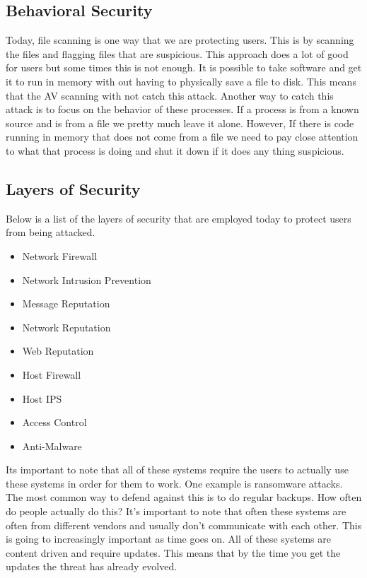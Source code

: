 \documentclass[letterpaper, onecolumn,10pt]{IEEEtran}
\begin{document}
            \subsection{Behavioral Security}
            Today, file scanning is one way that we are protecting users. This is by scanning the files and flagging files that are suspicious. This approach does a lot of good for users but some times this is not enough. It is possible to take software and get it to run in memory with out having to physically save a file to disk. This means that the AV scanning with not catch this attack. Another way to catch this attack is to focus on the behavior of these processes. If a process is from a known source and is from a file we pretty much leave it alone. However, If there is code running in memory that does not come from a file we need to pay close attention to what that process is doing and shut it down if it does any thing suspicious.\\
            
            \subsection{Layers of Security}
            Below is a list of the layers of security that are employed today to protect users from being attacked.
            \begin{itemize}
                \item Network Firewall
                \item Network Intrusion Prevention
                \item Message Reputation
                \item Network Reputation
                \item Web Reputation
                \item Host Firewall
                \item Host IPS
                \item Access Control
                \item Anti-Malware 
            \end{itemize}
            Its important to note that all of these systems require the users to actually use these systems in order for them to work. One example is ransomware attacks. The most common way to defend against this is to do regular backups. How often do people actually do this? It's important to note that often these systems are often from different vendors and usually don't communicate with each other. This is going to increasingly important as time goes on. All of these systems are content driven and require updates. This means that by the time you get the updates the threat has already evolved.\\
            
\end{document}
